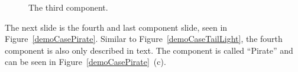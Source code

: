 	\begin{figure}[H]%
		\centering
		\qquad
		\qquad
		\caption{The third component.}
		\label{demoCaseBody}
	\end{figure}
	
The next slide is the fourth and last component slide, seen in Figure~\ref{demoCasePirate}. Similar to Figure~\ref{demoCaseTailLight}, the fourth component is also only described in text. The component is called ``Pirate'' and can be seen in Figure~\ref{demoCasePirate}~(c).

